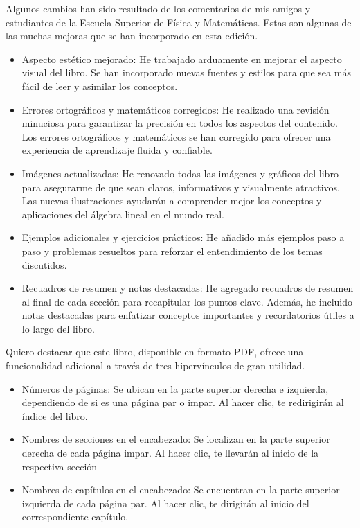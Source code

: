 Algunos cambios han sido resultado de los comentarios de mis amigos y estudiantes de la Escuela Superior de Física y Matemáticas. Estas son algunas de las muchas mejoras que se han incorporado en esta edición.
\begin{itemize}
    \item Aspecto estético mejorado: He trabajado arduamente en mejorar el aspecto visual del libro. Se han incorporado nuevas fuentes y estilos para que sea más fácil de leer y asimilar los conceptos.
    \item Errores ortográficos y matemáticos corregidos: He realizado una revisión minuciosa para garantizar la precisión en todos los aspectos del contenido. Los errores ortográficos y matemáticos se han corregido para ofrecer una experiencia de aprendizaje fluida y confiable.
    \item Imágenes actualizadas: He renovado todas las imágenes y gráficos del libro para asegurarme de que sean claros, informativos y visualmente atractivos. Las nuevas ilustraciones ayudarán a comprender mejor los conceptos y aplicaciones del álgebra lineal en el mundo real.
    \item Ejemplos adicionales y ejercicios prácticos: He añadido más ejemplos paso a paso y problemas resueltos para reforzar el entendimiento de los temas discutidos.
    \item Recuadros de resumen y notas destacadas: He agregado recuadros de resumen al final de cada sección para recapitular los puntos clave. Además, he incluido notas destacadas para enfatizar conceptos importantes y recordatorios útiles a lo largo del libro.
\end{itemize}
Quiero destacar que este libro, disponible en formato PDF, ofrece una funcionalidad adicional a través de tres hipervínculos de gran utilidad.
\begin{itemize}
    \item Números de páginas: Se ubican en la parte superior derecha e izquierda, dependiendo de si es una página par o impar. Al hacer clic, te redirigirán al índice del libro.
    \item Nombres de secciones en el encabezado: Se localizan en la parte superior derecha de cada página impar. Al hacer clic, te llevarán al inicio de la respectiva sección
    \item Nombres de capítulos en el encabezado: Se encuentran en la parte superior izquierda de cada página par. Al hacer clic, te dirigirán al inicio del correspondiente capítulo.
\end{itemize}

